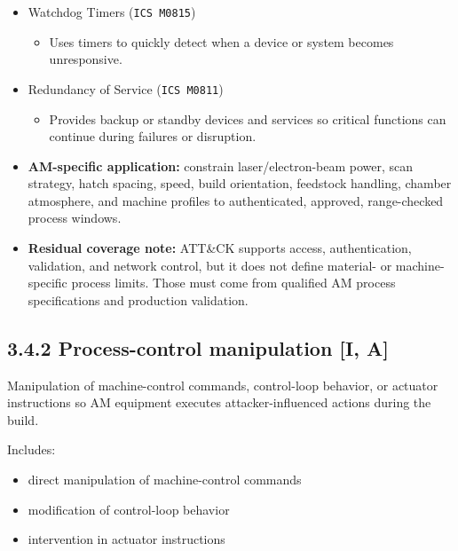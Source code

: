 \documentclass[10pt,a4paper,oneside]{report}
\begin{document}
\begin{itemize}
\begin{itemize}
\begin{itemize}
\item Uses independent safety systems to detect hazardous conditions and automatically drive equipment to a safer state.
\end{itemize}
\item Watchdog Timers (\texttt{ICS M0815})
\begin{itemize}
\item Uses timers to quickly detect when a device or system becomes unresponsive.
\end{itemize}
\item Redundancy of Service (\texttt{ICS M0811})
\begin{itemize}
\item Provides backup or standby devices and services so critical functions can continue during failures or disruption.
\end{itemize}
\end{itemize}
\end{itemize}

\begin{itemize}
\item \textbf{AM-specific application:} constrain laser/electron-beam power, scan strategy, hatch spacing, speed, build orientation, feedstock handling, chamber atmosphere, and machine profiles to authenticated, approved, range-checked process windows.
\end{itemize}

\begin{itemize}
\item \textbf{Residual coverage note:} ATT\&CK supports access, authentication, validation, and network control, but it does not define material- or machine-specific process limits. Those must come from qualified AM process specifications and production validation.
\end{itemize}


\subsection{3.4.2 Process-control manipulation [I, A]}


Manipulation of machine-control commands, control-loop behavior, or actuator instructions so AM equipment executes attacker-influenced actions during the build.

Includes:

\begin{itemize}
\item direct manipulation of machine-control commands
\item modification of control-loop behavior
\item intervention in actuator instructions
\end{itemize}
\end{document}
